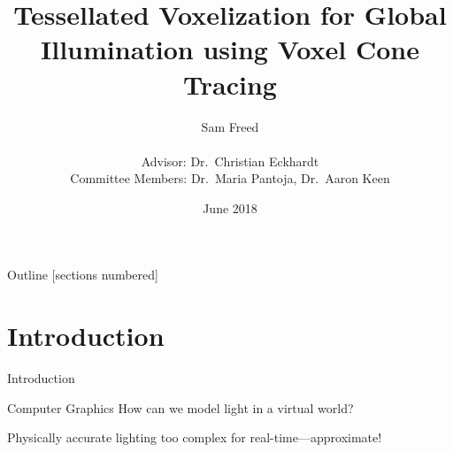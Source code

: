 \documentclass[10pt]{beamer}
\title{Tessellated Voxelization for Global Illumination using Voxel Cone Tracing}
\date{June 2018}
\author{Sam Freed\\\\Advisor: Dr.\ Christian Eckhardt\\Committee Members: Dr.\ Maria Pantoja, Dr.\ Aaron Keen\\}
\institute{California Polytechnic State University, San Luis Obispo}
\begin{document}
\frame{\titlepage}

\begin{frame}{Outline}
  [sections numbered]
  \tableofcontents[hideallsubsections]
\end{frame}


\section{Introduction}

\begin{frame}{Introduction}

  \begin{block}{Computer Graphics}
    How can we model light in a virtual world?

    Physically accurate lighting too complex for real-time---approximate!
  \end{block}
\end{frame}
\end{document}
